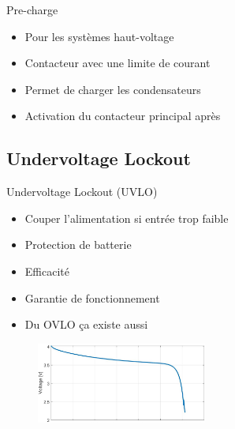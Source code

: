 \begin{frame}{Pre-charge}
    \begin{itemize}
        \item Pour les systèmes haut-voltage
        \item Contacteur avec une limite de courant
        \item Permet de charger les condensateurs
        \item Activation du contacteur principal après
    \end{itemize}

    \vfill

    \begin{center}
    \end{center}    
\end{frame}

\subsection{Undervoltage Lockout}

\begin{frame}{Undervoltage Lockout (UVLO)}
    \begin{itemize}
        \item Couper l'alimentation si entrée trop faible
        \bigskip
        \item Protection de batterie
        \item Efficacité
        \item Garantie de fonctionnement
        \bigskip
        \item Du OVLO ça existe aussi
    \end{itemize}
    \vfill
    \begin{figure}
        \centering
        \includegraphics[width=0.5\textwidth]{pictures/battery-discharge-curve.png}
    \end{figure}
\end{frame}

